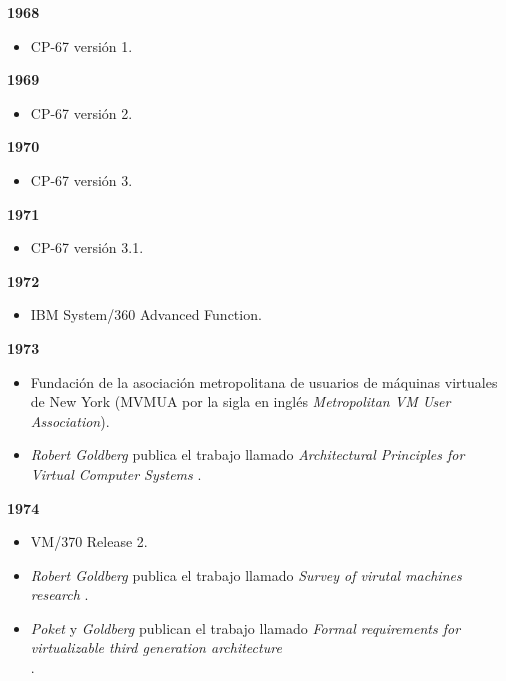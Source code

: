 \textbf{1968}\\
\begin{itemize}
	\item CP-67 versión 1.\\
\end{itemize}

\textbf{1969}\\
\begin{itemize}
	\item CP-67 versión 2.\\
\end{itemize}

\textbf{1970}\\
\begin{itemize}
	\item CP-67 versión 3.\\
\end{itemize}

\textbf{1971}\\
\begin{itemize}
	\item CP-67 versión 3.1.\\
\end{itemize}

\textbf{1972}\\
\begin{itemize}
	\item IBM System/360 Advanced Function.\\
\end{itemize}

\textbf{1973}\\
\begin{itemize}
	\item Fundación de la asociación metropolitana de usuarios de máquinas virtuales de New York (MVMUA por la sigla en inglés \textit{Metropolitan VM User Association}).\\
	
	\item \textit{Robert Goldberg} publica el trabajo llamado \textit{Architectural Principles for Virtual Computer Systems} \parencite{Goldberg1973}.\\
	
\end{itemize}

\textbf{1974}\\
\begin{itemize}
	\item VM/370 Release 2.\\
	
	\item \textit{Robert Goldberg} publica el trabajo llamado \textit{Survey of virutal machines research} \parencite{Goldberg1974}.\\
	
	\item \textit{Poket} y \textit{Goldberg} publican el trabajo llamado \textit{Formal requirements for virtualizable third generation architecture} \parencite{Popek1974}\\.
\end{itemize}


